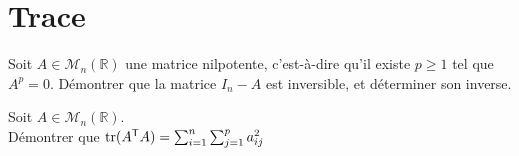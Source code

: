 \documentclass{book}
\begin{document}
\section{Trace}
\begin{Exercice}

Soit $A\in\mathcal M_n(\mathbb R)$ une matrice nilpotente, c'est-à-dire qu'il existe $p\geq 1$ tel que $A^p=0$. Démontrer que la matrice $I_n-A$ est inversible, et déterminer son inverse.
\end{Exercice}

\begin{Exercice}
Soit $A\in\mathcal M_n(\mathbb R)$.\\
Démontrer que $\operatorname{tr}(A^{\mathsf {T}} A)=\sum_{i=1}^n\sum_{j=1}^p a_{ij}^2$

\end{Exercice}
\end{document}
